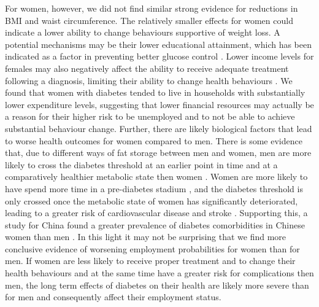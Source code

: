 For women, however, we did not find similar strong evidence for reductions in \ac{BMI} and waist circumference. The relatively smaller effects for women could indicate a lower ability to change behaviours supportive of weight loss. A potential mechanisms may be their lower educational attainment, which has been indicated as a factor in preventing better glucose control \autocite{Luo2015}. Lower income levels for females may also negatively affect the ability to receive adequate treatment following a diagnosis, limiting their ability to change health behaviours \autocite{Luo2015}. We found that women with diabetes tended to live in households with substantially lower expenditure levels, suggesting that lower financial resources may actually be a reason for their higher risk to be unemployed and to not be able to achieve substantial behaviour change. Further, there are likely biological factors that lead to worse health outcomes for women compared to men. There is some evidence that, due to different ways of fat storage between men and women, men are more likely to cross the diabetes threshold at an earlier point in time and at a comparatively healthier metabolic state then women \parencite{Peters2015,Peters2014a,Peters2014}. Women are more likely to have spend more time in a pre-diabetes stadium \parencite{Bertram2010}, and the diabetes threshold is only crossed once the metabolic state of women has significantly deteriorated, leading to a greater risk of cardiovascular disease and stroke \parencite{Peters2015}. Supporting this, a study for China found a greater prevalence of diabetes comorbidities in Chinese women than men \autocite{Liu2010}. In this light it may not be surprising that we find more conclusive evidence of worsening employment probabilities for women than for men. If women are less likely to receive proper treatment and to change their health behaviours and at the same time have a greater risk for complications then men, the long term effects of diabetes on their health are likely more severe than for men and consequently affect their employment status.

